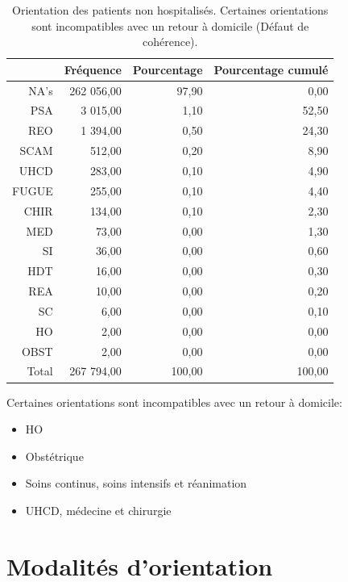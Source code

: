 \documentclass[12pt,english,french,twoside]{book}\usepackage[]{graphicx}\usepackage[]{color}
\begin{document}
\begin{table}[ht]
\centering
\begin{tabular}{rrrr}
  \hline
 & Fréquence & Pourcentage & Pourcentage cumulé \\ 
  \hline
NA's & 262 056,00 & 97,90 & 0,00 \\ 
  PSA & 3 015,00 & 1,10 & 52,50 \\ 
  REO & 1 394,00 & 0,50 & 24,30 \\ 
  SCAM & 512,00 & 0,20 & 8,90 \\ 
  UHCD & 283,00 & 0,10 & 4,90 \\ 
  FUGUE & 255,00 & 0,10 & 4,40 \\ 
  CHIR & 134,00 & 0,10 & 2,30 \\ 
  MED & 73,00 & 0,00 & 1,30 \\ 
  SI & 36,00 & 0,00 & 0,60 \\ 
  HDT & 16,00 & 0,00 & 0,30 \\ 
  REA & 10,00 & 0,00 & 0,20 \\ 
  SC & 6,00 & 0,00 & 0,10 \\ 
  HO & 2,00 & 0,00 & 0,00 \\ 
  OBST & 2,00 & 0,00 & 0,00 \\ 
    Total & 267 794,00 & 100,00 & 100,00 \\ 
   \hline
\end{tabular}
\caption[Orientation des patients non hospitalisés]{Orientation des patients non hospitalisés. Certaines orientations sont incompatibles avec un retour à domicile (Défaut de cohérence).} 
\label{tab:orient_nh}
\end{table}



Certaines orientations sont incompatibles avec un retour à domicile:
\begin{itemize}
  \item HO
  \item Obstétrique
  \item Soins continus, soins intensifs et réanimation
  \item UHCD, médecine et chirurgie
  
\end{itemize}




\newpage
\chapter{Modalités d'orientation}

\end{document}

